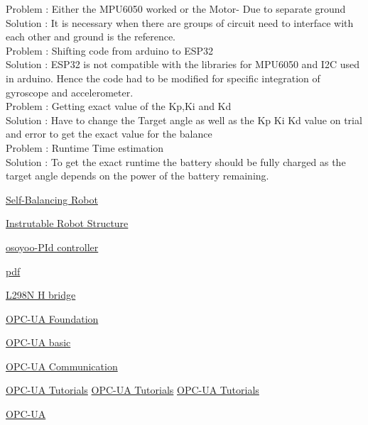 \documentclass{article}
\begin{document}
  Problem : Either the MPU6050 worked or the Motor- Due to separate ground\\
  Solution : It is necessary when there are groups of circuit need to interface with each other and ground is the reference. \\
  
  Problem : Shifting code from arduino to ESP32\\
  Solution : ESP32 is not compatible with the libraries for MPU6050 and I2C used in arduino. Hence the code had to be modified for specific integration of gyroscope and accelerometer.\\
    
  Problem : Getting exact value of the Kp,Ki and Kd\\
  Solution : Have to change the Target angle as well as the Kp Ki Kd value on trial and error to get the exact value for the balance\\
  
    Problem : Runtime Time estimation\\
  Solution : To get the exact runtime the battery should be fully charged as the target angle depends on the power of the battery remaining. 
    	
 	\pagebreak
 	\begin{thebibliography}{9}
 		\href{https://www.instructables.com/id/Arduino-Self-Balancing-Robot-1/}{Self-Balancing Robot}
 	
 		\href{https://www.instructables.com/id/Self-Balancing-Robot-1/}{Instrutable Robot Structure}
 		
 		\href{https://osoyoo.com/2018/08/08/self-balancing-robot-pid-control/}{osoyoo-PId controller} 
 		
 		\href{https://www.cs.cmu.edu/~16311}{pdf} 
 		 
 		 \href{https://howtomechatronics.com/tutorials/arduino/arduino-dc-motor-control-tutorial-l298n-pwm-h-bridge/}{L298N H bridge} 
 		 
 		 \href{http://opcfoundation.github.io/UA-LDS/}{OPC-UA Foundation}
 		 
 		 \href{https://opcfoundation.org/about/what-is-opc/}{OPC-UA basic}  
 		 
 		 \href{https://new.siemens.com/global/de/produkte/automatisierung/industrielle-kommunikation/opc-ua.html}{OPC-UA Communication}  
 		 
 		 \href{https://www.youtube.com/watch?v=NLNhHoo6X94}{OPC-UA Tutorials}  
 		 \href{https://www.youtube.com/watch?v=1NlbUAlOdcA}{OPC-UA Tutorials}  
 		 \href{https://www.youtube.com/watch?v=12dnhcEmrU0}{OPC-UA Tutorials}   
 		
 		\href{https://www.exorint.com/en/blog/the-introduction-of-opc-ua-pubsub-publish-subscribe-and-its-importance-to-manufacturers}{OPC-UA}  
 		
 	\end{thebibliography}
 	
\end{document}
